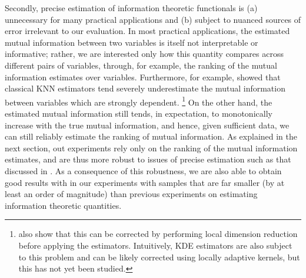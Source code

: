 \documentclass{article} %
\begin{document}
Secondly, precise estimation of information theoretic functionals is (a)
unnecessary for many practical applications and (b) subject to nuanced sources
of error irrelevant to our evaluation. In most practical applications, the
estimated mutual information between two variables is itself not interpretable
or informative; rather, we are interested only how this quantity compares
across different pairs of variables, through, for example, the ranking of the
mutual information estimates over variables. Furthermore, for example,
\cite{gao2014stronglyDependent} showed that classical KNN estimators tend
severely underestimate the mutual information between variables which are
strongly dependent.
\footnote{\cite{gao2014stronglyDependent} also show that this can be corrected
by performing local dimension reduction before applying the estimators.
Intuitively, KDE estimators are also subject to this problem and can be likely
corrected using locally adaptive kernels, but this has not yet been studied.}
On the other hand, the estimated mutual information still tends, in expectation,
to monotonically increase with the true mutual information, and hence, given
sufficient data, we can still reliably estimate the ranking of mutual
information. As explained in the next section, out experiments rely only on the
ranking of the mutual information estimates, and are thus more robust to issues
of precise estimation such as that discussed in
\cite{gao2014stronglyDependent}. As a consequence of this robustness, we are
also able to obtain good results with in our experiments with samples that are
far smaller (by at least an order of magnitude) than previous experiments on
estimating information theoretic quantities.
\end{document}
